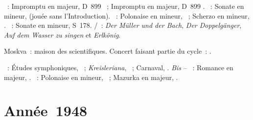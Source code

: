 \begin{description}
 \textsc{\Schubert{}}~: Impromptu en \kG \Flat majeur, D~899 ~;
 Impromptu en \kA \Flat majeur, D~899 .
 \textsc{\Schumann{}}~: Sonate en \kF \Sharp mineur,  (jouée sans
 l'\hbox{Introduction}).
 \textsc{\Chopin{}}~: Polonaise en \kF \Sharp mineur, ~; Scherzo en
 \kB mineur, .
 \textsc{\Liszt{}}~: Sonate en \kB mineur, S~178.
 \textsc{\Schubert{}/\Liszt{}}~: \emph{Der Müller und der Bach}, \emph{Der
 Doppelgänger}, \emph{Auf dem Wasser zu singen} et \emph{Erlkönig}.
 \item[\DateWithWeekDay{1947-12-28}]
 Moskva~: maison des scientifiques.
 Concert faisant partie du cycle~: .

 \textsc{\Schumann{}}~: Études symphoniques, ~;
 \emph{Kreisleriana}, ~; Carnaval, .
 \emph{Bis} -- \textsc{\Schumann{}}~: Romance en \kF \Sharp majeur,
  .
 \textsc{\Chopin{}}~: Polonaise en \kF \Sharp mineur, ~; Mazurka en
 \kD \Flat majeur,  .
\end{description}

\section{Année~1948}


